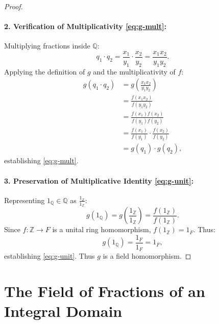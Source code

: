 \begin{content}
\begin{proof}
\paragraph{2. Verification of Multiplicativity \eqref{eq:g-mult}:}
Multiplying fractions inside $\mathbb{Q}$:
\[
q_1 \cdot q_2 = \frac{x_1}{y_1} \cdot \frac{x_2}{y_2} = \frac{x_1 x_2}{y_1 y_2}.
\]
Applying the definition of $g$ and the multiplicativity of $f$:
\begin{align*}
g(q_1 \cdot q_2) &= g\left(\frac{x_1 x_2}{y_1 y_2}\right) \\
&= \frac{f(x_1 x_2)}{f(y_1 y_2)} \\
&= \frac{f(x_1) f(x_2)}{f(y_1) f(y_2)} \\
&= \frac{f(x_1)}{f(y_1)} \cdot \frac{f(x_2)}{f(y_2)} \\
&= g(q_1) \cdot g(q_2),
\end{align*}
establishing \eqref{eq:g-mult}.

\paragraph{3. Preservation of Multiplicative Identity \eqref{eq:g-unit}:}
Representing $1_\mathbb{Q} \in \mathbb{Q}$ as $\frac{1_\mathbb{Z}}{1_\mathbb{Z}}$:
\[
g(1_\mathbb{Q}) = g\left(\frac{1_\mathbb{Z}}{1_\mathbb{Z}}\right) = \frac{f(1_\mathbb{Z})}{f(1_\mathbb{Z})}.
\]
Since $f \colon \mathbb{Z} \to F$ is a unital ring homomorphism, $f(1_\mathbb{Z}) = 1_F$. Thus:
\[
g(1_\mathbb{Q}) = \frac{1_F}{1_F} = 1_F,
\]
establishing \eqref{eq:g-unit}. Thus $g$ is a field homomorphism.
\end{proof}
\end{content}

\section{The Field of Fractions of an Integral Domain}

